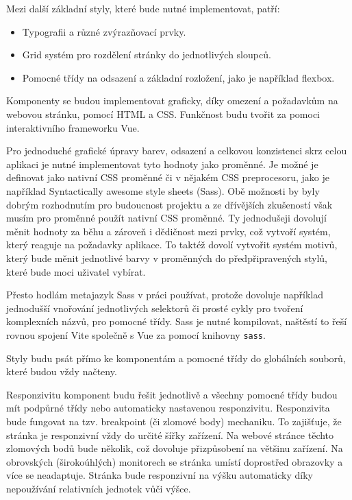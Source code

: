 Mezi další základní styly, které bude nutné implementovat, patří:

\begin{itemize}
    \item Typografii a různé zvýrazňovací prvky.
    \item Grid systém pro rozdělení stránky do jednotlivých sloupců.
    \item Pomocné třídy na odsazení a základní rozložení, jako je například flexbox.
\end{itemize}

Komponenty se budou implementovat graficky, díky omezení a požadavkům na webovou stránku, pomocí HTML a CSS.
Funkčnost budu tvořit za pomoci interaktivního frameworku Vue.

Pro jednoduché grafické úpravy barev, odsazení a celkovou konzistenci skrz celou aplikaci je nutné implementovat tyto hodnoty jako proměnné.
Je možné je definovat jako nativní CSS proměnné či v nějakém CSS preprocesoru, jako je například Syntactically awesome style sheets (Sass).
Obě možnosti by byly dobrým rozhodnutím pro budoucnost projektu a ze dřívějších zkušeností však musím pro proměnné použít nativní CSS proměnné.
Ty jednodušeji dovolují měnit hodnoty za běhu a zároveň i dědičnost mezi prvky, což vytvoří systém, který reaguje na požadavky aplikace.
To taktéž dovolí vytvořit systém motivů, který bude měnit jednotlivé barvy v proměnných do předpřipravených stylů, které bude moci uživatel vybírat.

Přesto hodlám metajazyk Sass v práci používat, protože dovoluje například jednodušší vnořování jednotlivých selektorů či prosté cykly pro tvoření komplexních názvů, pro pomocné třídy.
Sass je nutné kompilovat, naštěstí to řeší rovnou spojení Vite společně s Vue za pomocí knihovny \texttt{sass}.

Styly budu psát přímo ke komponentám a pomocné třídy do globálních souborů, které budou vždy načteny.

Responzivitu komponent budu řešit jednotlivě a všechny pomocné třídy budou mít podpůrné třídy nebo automaticky nastavenou responzivitu.
Responzivita bude fungovat na tzv. breakpoint (či zlomové body) mechaniku.
To zajišťuje, že stránka je responzivní vždy do určité šířky zařízení.
Na webové stránce těchto zlomových bodů bude několik, což dovoluje přizpůsobení na většinu zařízení.
Na obrovských (širokoúhlých) monitorech se stránka umístí doprostřed obrazovky a více se neadaptuje.
Stránka bude responzivní na výšku automaticky díky nepoužívání relativních jednotek vůči výšce.

